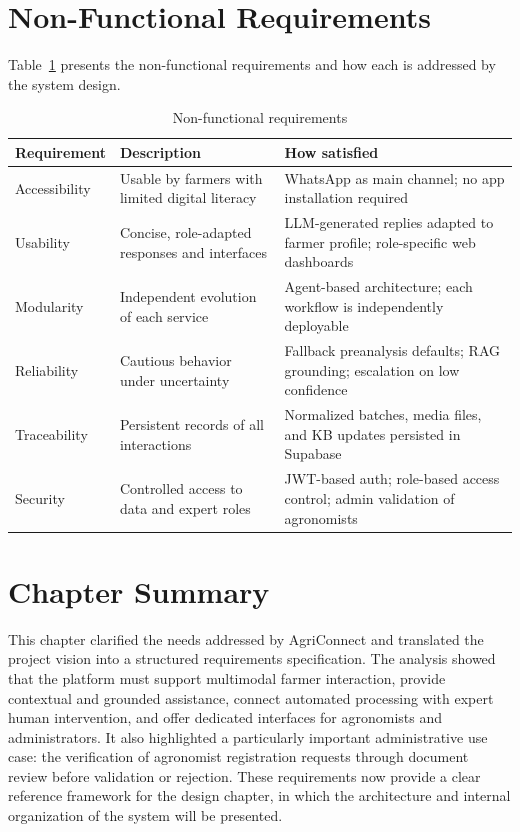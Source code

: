 \section{Non-Functional Requirements}

Table~\ref{tab:nonfunctional-req} presents the non-functional requirements and how each is addressed by the system design.

\begin{table}[H]
\centering
\caption{Non-functional requirements}
\label{tab:nonfunctional-req}
\begin{tabular}{p{3cm} p{5cm} p{5cm}}
\toprule
\textbf{Requirement} & \textbf{Description} & \textbf{How satisfied} \\
\midrule
Accessibility    & Usable by farmers with limited digital literacy & WhatsApp as main channel; no app installation required \cite{anrt2025} \\
Usability        & Concise, role-adapted responses and interfaces & LLM-generated replies adapted to farmer profile; role-specific web dashboards \\
Modularity       & Independent evolution of each service & Agent-based architecture; each workflow is independently deployable \\
Reliability      & Cautious behavior under uncertainty & Fallback preanalysis defaults; RAG grounding; escalation on low confidence \\
Traceability     & Persistent records of all interactions & Normalized batches, media files, and KB updates persisted in Supabase \\
Security         & Controlled access to data and expert roles & JWT-based auth; role-based access control; admin validation of agronomists \\
\bottomrule
\end{tabular}
\end{table}

\section{Chapter Summary}

This chapter clarified the needs addressed by AgriConnect and translated the project vision into a structured requirements specification. The analysis showed that the platform must support multimodal farmer interaction, provide contextual and grounded assistance, connect automated processing with expert human intervention, and offer dedicated interfaces for agronomists and administrators. It also highlighted a particularly important administrative use case: the verification of agronomist registration requests through document review before validation or rejection. These requirements now provide a clear reference framework for the design chapter, in which the architecture and internal organization of the system will be presented.